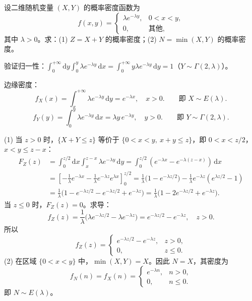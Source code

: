 \documentclass[lang=cn,11pt]{elegantbook}
\begin{document}
\begin{exercise}[指数分布条件区域] \label{exer:3-12b}
设二维随机变量 $(X,Y)$ 的概率密度函数为
\[
f(x,y) = \begin{cases} \lambda e^{-\lambda y}, & 0 < x < y, \\ 0, & \text{其他}, \end{cases}
\]
其中 $\lambda > 0$。求：(1) $Z = X + Y$ 的概率密度；(2) $N = \min(X,Y)$ 的概率密度。
\end{exercise}

\begin{solution}
验证归一性：$\displaystyle\int_0^{+\infty}\mathrm{d}y\int_0^y \lambda e^{-\lambda y}\,\mathrm{d}x = \int_0^{+\infty}y\lambda e^{-\lambda y}\,\mathrm{d}y = 1$（$Y \sim \Gamma(2,\lambda)$）。

边缘密度：
\[
f_X(x) = \int_x^{+\infty}\lambda e^{-\lambda y}\,\mathrm{d}y = e^{-\lambda x}, \quad x > 0. \qquad \text{即 } X \sim E(\lambda).
\]
\[
f_Y(y) = \int_0^y \lambda e^{-\lambda y}\,\mathrm{d}x = \lambda y\,e^{-\lambda y}, \quad y > 0. \qquad \text{即 } Y \sim \Gamma(2,\lambda).
\]

(1) 当 $z > 0$ 时，$\{X+Y \leqslant z\}$ 等价于 $\{0 < x < y,\ x+y \leqslant z\}$，即 $0 < x < z/2$，$x < y \leqslant z-x$：
\begin{align*}
F_Z(z) &= \int_0^{z/2}\mathrm{d}x\int_x^{z-x}\lambda e^{-\lambda y}\,\mathrm{d}y = \int_0^{z/2}(e^{-\lambda x} - e^{-\lambda(z-x)})\,\mathrm{d}x\\
&= \left[-\frac{1}{\lambda}e^{-\lambda x} - \frac{1}{\lambda}e^{-\lambda z}e^{\lambda x}\right]_0^{z/2} = \frac{1}{\lambda}\bigl(1 - e^{-\lambda z/2}\bigr) - \frac{1}{\lambda}e^{-\lambda z}(e^{\lambda z/2} - 1)\\
&= \frac{1}{\lambda}\bigl(1 - e^{-\lambda z/2} - e^{-\lambda z/2} + e^{-\lambda z}\bigr) = \frac{1}{\lambda}\bigl(1 - 2e^{-\lambda z/2} + e^{-\lambda z}\bigr).
\end{align*}
当 $z \leqslant 0$ 时，$F_Z(z) = 0$。求导：
\[
f_Z(z) = \frac{1}{\lambda}\bigl(\lambda e^{-\lambda z/2} - \lambda e^{-\lambda z}\bigr) = e^{-\lambda z/2} - e^{-\lambda z}, \quad z > 0.
\]
所以
\[
f_Z(z) = \begin{cases} e^{-\lambda z/2} - e^{-\lambda z}, & z > 0, \\ 0, & z \leqslant 0. \end{cases}
\]
(2) 在区域 $\{0 < x < y\}$ 中，$\min(X,Y) = X$。因此 $N = X$，其密度为
\[
f_N(n) = f_X(n) = \begin{cases} e^{-\lambda n}, & n > 0, \\ 0, & n \leqslant 0. \end{cases}
\]
即 $N \sim E(\lambda)$。
\end{solution}
\end{document}
